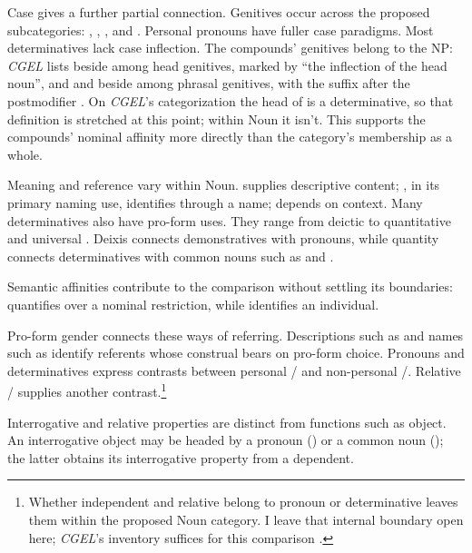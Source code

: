 \documentclass[12pt]{article}
\begin{document}
Case gives a further partial connection. Genitives occur across the proposed subcategories: , , , and . Personal pronouns have fuller case paradigms. Most determinatives lack case inflection. The compounds' genitives belong to the NP: \textit{CGEL} lists  beside  among head genitives, marked by \enquote{the inflection of the head noun}, and  and  beside  among phrasal genitives, with the suffix after the postmodifier \citep[479]{huddleston2002}. On \textit{CGEL}'s categorization the head of  is a determinative, so that definition is stretched at this point; within Noun it isn't. This supports the compounds' nominal affinity more directly than the category's membership as a whole.

Meaning and reference vary within Noun.  supplies descriptive content; , in its primary naming use, identifies through a name;  depends on context. Many determinatives also have pro-form uses. They range from deictic  to quantitative  and universal  \citep[358--360, 370--405, 425--428, 515--521]{huddleston2002}. Deixis connects demonstratives with pronouns, while quantity connects determinatives with common nouns such as  and .

Semantic affinities contribute to the comparison without settling its boundaries:  quantifies over a nominal restriction, while  identifies an individual.

Pro-form gender \citep{reynolds2025proformgender} connects these ways of referring. Descriptions such as  and names such as  identify referents whose construal bears on pro-form choice. Pronouns and determinatives express contrasts between personal / and non-personal /. Relative / supplies another contrast.\footnote{Whether independent  and relative  belong to pronoun or determinative leaves them within the proposed Noun category. I leave that internal boundary open here; \textit{CGEL}'s inventory suffices for this comparison \citep[397--399]{huddleston2002}.}

Interrogative and relative properties are distinct from functions such as object. An interrogative object may be headed by a pronoun () or a common noun (); the latter obtains its interrogative property from a dependent.
\end{document}
